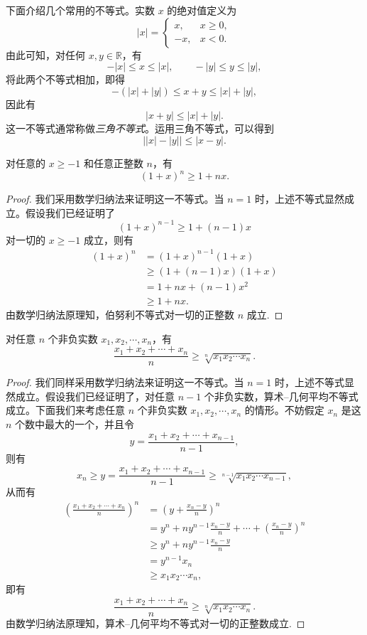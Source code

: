 下面介绍几个常用的不等式。实数 $x$ 的绝对值定义为
\[
  |x|=\begin{cases}
    x, & x\geqslant0,\\
    -x, & x<0.
  \end{cases}
\]
由此可知，对任何 $x,y\in\mathbb{R}$，有
\[
  -|x|\leqslant x\leqslant |x|,\qquad -|y|\leqslant y\leqslant |y|,
\]
将此两个不等式相加，即得
\[
  -(|x|+|y|)\leqslant x+y\leqslant |x|+|y|,
\]
因此有
\[
  |x+y|\leqslant |x|+|y|.
\]
这一不等式通常称做\emph{三角不等式}。运用三角不等式，可以得到
\[
  \bigl||x|-|y|\bigr|\leqslant |x-y|.
\]

\begin{theorem}\label{theorem:ma-1-source-10}
对任意的 $x\geqslant -1$ 和任意正整数 $n$，有
\[
  (1+x)^n\geqslant 1+nx.
\]
\end{theorem}


\begin{proof}
我们采用数学归纳法来证明这一不等式。当 $n=1$ 时，上述不等式显然成立。假设我们已经证明了
\[
  (1+x)^{n-1}\geqslant 1+(n-1)x
\]
对一切的 $x\geqslant -1$ 成立，则有
\[
\begin{aligned}
  (1+x)^n
  &= (1+x)^{n-1}(1+x)\\
  &\geqslant (1+(n-1)x)(1+x)\\
  &=1+nx+(n-1)x^2\\
  &\geqslant 1+nx.
\end{aligned}
\]
由数学归纳法原理知，伯努利不等式对一切的正整数 $n$ 成立.
\end{proof}


\begin{theorem}[{算术--几何平均不等式}]\label{theorem:ma-1-source-12}
对任意 $n$ 个非负实数 $x_1,x_2,\cdots,x_n$，有
\[
  \frac{x_1+x_2+\cdots+x_n}{n}\geqslant \sqrt[n]{x_1x_2\cdots x_n}.
\]
\end{theorem}


\begin{proof}
我们同样采用数学归纳法来证明这一不等式。当 $n=1$ 时，上述不等式显然成立。假设我们已经证明了，对任意 $n-1$ 个非负实数，算术--几何平均不等式成立。下面我们来考虑任意 $n$ 个非负实数 $x_1,x_2,\cdots,x_n$ 的情形。不妨假定 $x_n$ 是这 $n$ 个数中最大的一个，并且令
\[
  y=\frac{x_1+x_2+\cdots+x_{n-1}}{n-1},
\]
则有
\[
  x_n\geqslant y=\frac{x_1+x_2+\cdots+x_{n-1}}{n-1}
  \geqslant \sqrt[n-1]{x_1x_2\cdots x_{n-1}},
\]
从而有
\[
\begin{aligned}
  \left(\frac{x_1+x_2+\cdots+x_n}{n}\right)^n
  &=\left(y+\frac{x_n-y}{n}\right)^n\\
  &=y^n+ny^{n-1}\frac{x_n-y}{n}+\cdots+\left(\frac{x_n-y}{n}\right)^n\\
  &\geqslant y^n+ny^{n-1}\frac{x_n-y}{n}\\
  &=y^{n-1}x_n\\
  &\geqslant x_1x_2\cdots x_n,
\end{aligned}
\]
即有
\[
  \frac{x_1+x_2+\cdots+x_n}{n}\geqslant \sqrt[n]{x_1x_2\cdots x_n}.
\]
由数学归纳法原理知，算术--几何平均不等式对一切的正整数成立.
\end{proof}


